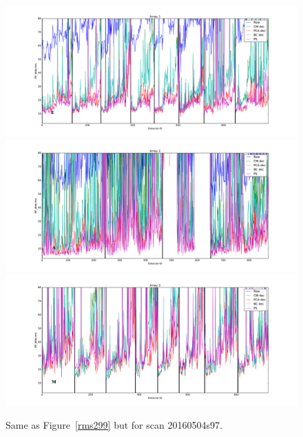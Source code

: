 \begin{figure}[ht] %
\begin{center}
\includegraphics[scale=0.26]{Figures/DarkTests/rms_TOI_array_1_20160504s97.pdf} 
\includegraphics[scale=0.26]{Figures/DarkTests/rms_TOI_array_2_20160504s97.pdf} 
\includegraphics[scale=0.26]{Figures/DarkTests/rms_TOI_array_3_20160504s97.pdf} 
\end{center}
\caption{Same as Figure~\ref{rms299} but for scan 20160504s97. \label{rms97}}
\end{figure}



